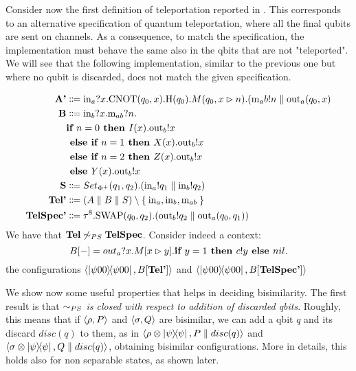 Consider now the first definition of teleportation reported in \cite{fengBisimulationQuantumProcesses2012}. This corresponds to an  alternative specification of quantum teleportation, where all the final qubits are sent on channels. As a consequence, to match the specification, the implementation must behave the same also in the qbits that are not "teleported". We will see that the following
implementation, similar to the previous one
but where no qubit is discarded, does not
match the given specification.
\begin{example}
\begin{align*}
  \text{\textbf{A'}} &\Coloneqq \text{in}_a?x.\text{CNOT}(q_0, x).\text{H}(q_0).M(q_0, x \rhd n).(\text{m}_ab!n \parallel \text{out}_a(q_0, x)\\
  \text{\textbf{B}} &\Coloneqq \text{in}_b?x.\text{m}_{ab}?n.
     \\ & \textbf{if } n = 0 \textbf{ then } I(x).\text{out}_b!x\\& \textbf{ else } \textbf{if } n = 1 \textbf{ then } X(x).\text{out}_b!x\\& \textbf{ else } \textbf{if } n = 2 \textbf{ then } Z(x).\text{out}_b!x\\& \textbf{ else } Y(x).\text{out}_b!x
   \\
  \text{\textbf{S}} &\Coloneqq Set_{\Phi^+}(q_1, q_2).(\text{in}_a!q_1 \parallel \text{in}_b!q_2) \\
  \text{\textbf{Tel'}} &\Coloneqq (A \parallel B \parallel S) \setminus \Set{\text{in}_a, \text{in}_b, \text{m}_{ab} } \\
  \text{\textbf{TelSpec'}} &\Coloneqq \tau^8.\text{SWAP}(q_0,q_2).(\text{out}_b!q_2 \parallel \text{out}_a(q_0, q_1))
\end{align*}
	We have that $\text{\textbf{Tel}} \not\sim_{PS} \text{\textbf{TelSpec}}$.
	Consider indeed a context:
  \[ B[{-}] = out_{a} ? x . M[x \rhd y] . \textbf{if } y = 1 \textbf{ then } c!y \textbf{ else } nil. \]
  the configurations $\langle\ket{\psi 00}\!\!\bra{\psi 00}, B[\text{\textbf{Tel'}}]\rangle$ and $\langle\ket{\psi 00}\!\!\bra{\psi 00}, B[\text{\textbf{TelSpec'}}]\rangle$
\end{example}


We show now some useful properties that helps in deciding bisimilarity. The first result is that \textit{$\sim_{PS}$ is closed with respect to addition of discarded qbits}.  Roughly, this means that if  $\langle\rho, P\rangle$ and $\langle\sigma, Q\rangle$ are bisimilar,  we can add a qbit $q$ and its discard $disc(q)$ to them, as in  $\langle\rho \otimes \ket{\psi}\!\!\bra{\psi}, P \parallel disc(q)\rangle$ and $\langle\sigma \otimes \ket{\psi}\!\!\bra{\psi}, Q \parallel disc(q)\rangle$, obtaining bisimilar configurations. More in details, this holds also for non separable states, as shown later.

